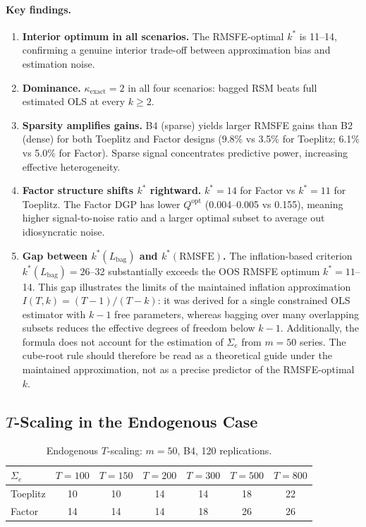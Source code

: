 \documentclass[12pt,a4paper]{article}
\theoremstyle{definition}
\begin{document}
\paragraph{Key findings.}
\begin{enumerate}
\item \textbf{Interior optimum in all scenarios.} The RMSFE-optimal $k^*$
  is 11--14, confirming a genuine interior trade-off between approximation
  bias and estimation noise.
\item \textbf{Dominance.} $\kappa_{\mathrm{exact}}=2$ in all four scenarios:
  bagged RSM beats full estimated OLS at every $k\geq 2$.
\item \textbf{Sparsity amplifies gains.} B4 (sparse) yields larger RMSFE
  gains than B2 (dense) for both Toeplitz and Factor designs (9.8\% vs 3.5\%
  for Toeplitz; 6.1\% vs 5.0\% for Factor). Sparse signal concentrates
  predictive power, increasing effective heterogeneity.
\item \textbf{Factor structure shifts $k^*$ rightward.} $k^*=14$ for Factor
  vs $k^*=11$ for Toeplitz. The Factor DGP has lower $Q^{\mathrm{opt}}$
  (0.004--0.005 vs 0.155), meaning higher signal-to-noise ratio and a larger
  optimal subset to average out idiosyncratic noise.
\item \textbf{Gap between $k^*(L_{\mathrm{bag}})$ and $k^*(\mathrm{RMSFE})$.}
  The inflation-based criterion $k^*(L_{\mathrm{bag}})=26$--32 substantially
  exceeds the OOS RMSFE optimum $k^*=11$--14. This gap illustrates the limits
  of the maintained inflation approximation $I(T,k)=(T-1)/(T-k)$: it was
  derived for a single constrained OLS estimator with $k-1$ free parameters,
  whereas bagging over many overlapping subsets reduces the effective
  degrees of freedom below $k-1$. Additionally, the formula does not account
  for the estimation of $\Sigma_e$ from $m=50$ series. The cube-root rule
  should therefore be read as a theoretical guide under the maintained
  approximation, not as a precise predictor of the RMSFE-optimal $k$.
\end{enumerate}

\subsection{$T$-Scaling in the Endogenous Case}

\begin{table}[ht]
\centering
\caption{Endogenous $T$-scaling: $m=50$, B4, 120 replications.}
\label{tab:endo_scaling}
\begin{tabular}{lcccccc}
\toprule
$\Sigma_e$ & $T=100$ & $T=150$ & $T=200$ & $T=300$ & $T=500$ & $T=800$ \\
\midrule
Toeplitz & 10 & 10 & 14 & 14 & 18 & 22 \\
Factor   & 14 & 14 & 14 & 18 & 26 & 26 \\
\bottomrule
\end{tabular}
\end{table}
\end{document}
